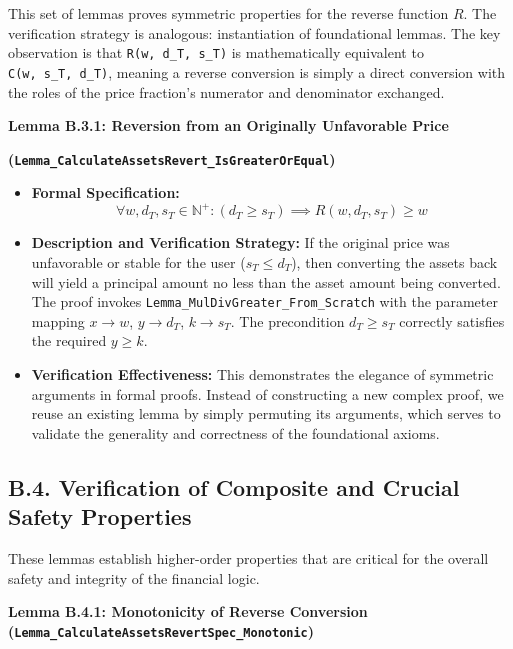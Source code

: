 \documentclass[
  english,
  onecolumn]{article}
\providecommand{\tightlist}{%
  \setlength{\itemsep}{0pt}\setlength{\parskip}{0pt}}
\begin{document}
This set of lemmas proves symmetric properties for the reverse function
\(R\). The verification strategy is analogous: instantiation of
foundational lemmas. The key observation is that
\texttt{R(w,\ d\_T,\ s\_T)} is mathematically equivalent to
\texttt{C(w,\ s\_T,\ d\_T)}, meaning a reverse conversion is simply a
direct conversion with the roles of the price fraction's numerator and
denominator exchanged.

\textbf{Lemma B.3.1: Reversion from an Originally Unfavorable Price}

\textbf{(\texttt{Lemma\_CalculateAssetsRevert\_IsGreaterOrEqual})}

\begin{itemize}
\tightlist
\item
  \textbf{Formal Specification:}
  \[ \forall w, d_T, s_T \in \mathbb{N}^+ : (d_T \ge s_T) \implies R(w, d_T, s_T) \ge w \]
\item
  \textbf{Description and Verification Strategy:} If the original price
  was unfavorable or stable for the user (\(s_T \le d_T\)), then
  converting the assets back will yield a principal amount no less than
  the asset amount being converted. The proof invokes
  \texttt{Lemma\_MulDivGreater\_From\_Scratch} with the parameter
  mapping \(x \to w\), \(y \to d_T\), \(k \to s_T\). The precondition
  \(d_T \ge s_T\) correctly satisfies the required \(y \ge k\).
\item
  \textbf{Verification Effectiveness:} This demonstrates the elegance of
  symmetric arguments in formal proofs. Instead of constructing a new
  complex proof, we reuse an existing lemma by simply permuting its
  arguments, which serves to validate the generality and correctness of
  the foundational axioms.
\end{itemize}

\subsection{B.4. Verification of Composite and Crucial Safety
Properties}\label{b.4.-verification-of-composite-and-crucial-safety-properties}

These lemmas establish higher-order properties that are critical for the
overall safety and integrity of the financial logic.

\textbf{Lemma B.4.1: Monotonicity of Reverse Conversion
(\texttt{Lemma\_CalculateAssetsRevertSpec\_Monotonic})}
\end{document}
